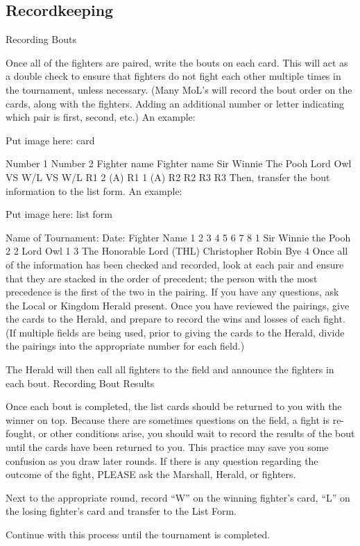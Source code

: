 \documentclass{article}
\begin{document}
\subsection{Recordkeeping}
Recording Bouts

Once all of the fighters are paired, write the bouts on each card. This will act as a double check to ensure
that fighters do not fight each other multiple times in the tournament, unless necessary. (Many MoL’s will
record the bout order on the cards, along with the fighters. Adding an additional number or letter
indicating which pair is first, second, etc.) An example:

Put image here: card

Number 1 Number 2
Fighter name Fighter name
Sir
Winnie The Pooh Lord Owl
VS W/L VS W/L
R1 2 (A) R1 1 (A)
R2 R2
R3 R3
Then, transfer the bout information to the list form. An example:

Put image here: list form

Name of Tournament: Date:
Fighter Name 1 2 3 4 5 6 7 8
1 Sir Winnie the Pooh 2
2 Lord Owl 1
3
The Honorable Lord (THL)
Christopher Robin Bye
4
Once all of the information has been checked and recorded, look at each pair and ensure that they are
stacked in the order of precedent; the person with the most precedence is the first of the two in the pairing.
If you have any questions, ask the Local or Kingdom Herald present. Once you have reviewed the
pairings, give the cards to the Herald, and prepare to record the wins and losses of each fight. (If multiple
fields are being used, prior to giving the cards to the Herald, divide the pairings into the appropriate
number for each field.)

The Herald will then call all fighters to the field and announce the fighters in each bout.
Recording Bout Results

Once each bout is completed, the list cards should be returned to you with the winner on top. Because
there are sometimes questions on the field, a fight is re-fought, or other conditions arise, you should wait
to record the results of the bout until the cards have been returned to you. This practice may save you
some confusion as you draw later rounds. If there is any question regarding the outcome of the fight,
PLEASE ask the Marshall, Herald, or fighters.

Next to the appropriate round, record “W” on the winning fighter’s card, “L” on the losing fighter’s card
and transfer to the List Form.

Continue with this process until the tournament is completed.
\end{document}
